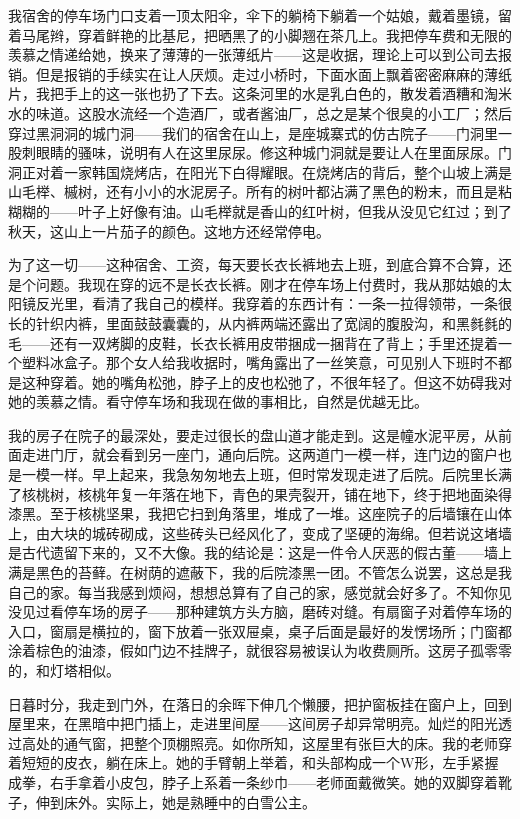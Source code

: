 我宿舍的停车场门口支着一顶太阳伞，伞下的躺椅下躺着一个姑娘，戴着墨镜，留着马尾辫，穿着鲜艳的比基尼，把晒黑了的小脚翘在茶几上。我把停车费和无限的羡慕之情递给她，换来了薄薄的一张薄纸片——这是收据，理论上可以到公司去报销。但是报销的手续实在让人厌烦。走过小桥时，下面水面上飘着密密麻麻的薄纸片，我把手上的这一张也扔了下去。这条河里的水是乳白色的，散发着酒糟和淘米水的味道。这股水流经一个造酒厂，或者酱油厂，总之是某个很臭的小工厂；然后穿过黑洞洞的城门洞——我们的宿舍在山上，是座城寨式的仿古院子——门洞里一股刺眼睛的骚味，说明有人在这里尿尿。修这种城门洞就是要让人在里面尿尿。门洞正对着一家韩国烧烤店，在阳光下白得耀眼。在烧烤店的背后，整个山坡上满是山毛榉、槭树，还有小小的水泥房子。所有的树叶都沾满了黑色的粉末，而且是粘糊糊的——叶子上好像有油。山毛榉就是香山的红叶树，但我从没见它红过；到了秋天，这山上一片茄子的颜色。这地方还经常停电。 

为了这一切——这种宿舍、工资，每天要长衣长裤地去上班，到底合算不合算，还是个问题。我现在穿的远不是长衣长裤。刚才在停车场上付费时，我从那姑娘的太阳镜反光里，看清了我自己的模样。我穿着的东西计有：一条一拉得领带，一条很长的针织内裤，里面鼓鼓囊囊的，从内裤两端还露出了宽阔的腹股沟，和黑毵毵的毛——还有一双烤脚的皮鞋，长衣长裤用皮带捆成一捆背在了背上；手里还提着一个塑料冰盒子。那个女人给我收据时，嘴角露出了一丝笑意，可见别人下班时不都是这种穿着。她的嘴角松弛，脖子上的皮也松弛了，不很年轻了。但这不妨碍我对她的羡慕之情。看守停车场和我现在做的事相比，自然是优越无比。 

我的房子在院子的最深处，要走过很长的盘山道才能走到。这是幢水泥平房，从前面走进门厅，就会看到另一座门，通向后院。这两道门一模一样，连门边的窗户也是一模一样。早上起来，我急匆匆地去上班，但时常发现走进了后院。后院里长满了核桃树，核桃年复一年落在地下，青色的果壳裂开，铺在地下，终于把地面染得漆黑。至于核桃坚果，我把它扫到角落里，堆成了一堆。这座院子的后墙镶在山体上，由大块的城砖砌成，这些砖头已经风化了，变成了坚硬的海绵。但若说这堵墙是古代遗留下来的，又不大像。我的结论是：这是一件令人厌恶的假古董——墙上满是黑色的苔藓。在树荫的遮蔽下，我的后院漆黑一团。不管怎么说罢，这总是我自己的家。每当我感到烦闷，想想总算有了自己的家，感觉就会好多了。不知你见没见过看停车场的房子——那种建筑方头方脑，磨砖对缝。有扇窗子对着停车场的入口，窗扇是横拉的，窗下放着一张双屉桌，桌子后面是最好的发愣场所；门窗都涂着棕色的油漆，假如门边不挂牌子，就很容易被误认为收费厕所。这房子孤零零的，和灯塔相似。 

日暮时分，我走到门外，在落日的余晖下伸几个懒腰，把护窗板挂在窗户上，回到屋里来，在黑暗中把门插上，走进里间屋——这间房子却异常明亮。灿烂的阳光透过高处的通气窗，把整个顶棚照亮。如你所知，这屋里有张巨大的床。我的老师穿着短短的皮衣，躺在床上。她的手臂朝上举着，和头部构成一个W形，左手紧握成拳，右手拿着小皮包，脖子上系着一条纱巾——老师面戴微笑。她的双脚穿着靴子，伸到床外。实际上，她是熟睡中的白雪公主。 

